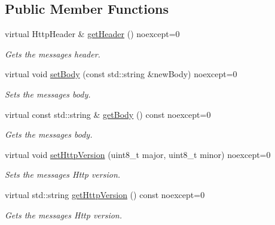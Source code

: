 \subsection*{Public Member Functions}
\begin{DoxyCompactItemize}
\item 
\mbox{\label{classZiApi_1_1HttpMessage_a8d6cc71afdd4ac5b3e47bb8b17583eac}} 
virtual Http\+Header \& \mbox{\hyperlink{classZiApi_1_1HttpMessage_a8d6cc71afdd4ac5b3e47bb8b17583eac}{get\+Header}} () noexcept=0
\begin{DoxyCompactList}\small\item\em Gets the message\textquotesingle{}s header. \end{DoxyCompactList}\item 
\mbox{\label{classZiApi_1_1HttpMessage_a12c1c080067de6727b98adbcce1ed79d}} 
virtual void \mbox{\hyperlink{classZiApi_1_1HttpMessage_a12c1c080067de6727b98adbcce1ed79d}{set\+Body}} (const std\+::string \&new\+Body) noexcept=0
\begin{DoxyCompactList}\small\item\em Sets the message\textquotesingle{}s body. \end{DoxyCompactList}\item 
\mbox{\label{classZiApi_1_1HttpMessage_a92e27ef64abcdcbf18519efe65434807}} 
virtual const std\+::string \& \mbox{\hyperlink{classZiApi_1_1HttpMessage_a92e27ef64abcdcbf18519efe65434807}{get\+Body}} () const noexcept=0
\begin{DoxyCompactList}\small\item\em Gets the message\textquotesingle{}s body. \end{DoxyCompactList}\item 
\mbox{\label{classZiApi_1_1HttpMessage_aa777191d2f0c8cfc3579c8dfc1b455d4}} 
virtual void \mbox{\hyperlink{classZiApi_1_1HttpMessage_aa777191d2f0c8cfc3579c8dfc1b455d4}{set\+Http\+Version}} (uint8\+\_\+t major, uint8\+\_\+t minor) noexcept=0
\begin{DoxyCompactList}\small\item\em Sets the message\textquotesingle{}s Http version. \end{DoxyCompactList}\item 
virtual std\+::string \mbox{\hyperlink{classZiApi_1_1HttpMessage_a5b8b70f012a623dd79dcbd6a49ec4704}{get\+Http\+Version}} () const noexcept=0
\begin{DoxyCompactList}\small\item\em Gets the message\textquotesingle{}s Http version. \end{DoxyCompactList}\end{DoxyCompactItemize}
